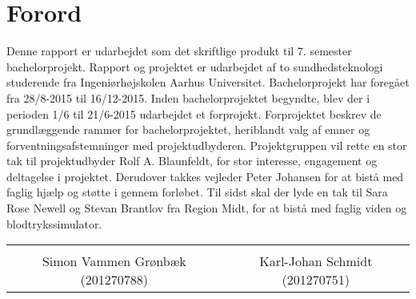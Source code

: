 \chapter*{Forord}

Denne rapport er udarbejdet som det skriftlige produkt til 7. semester bachelorprojekt. Rapport og projektet er udarbejdet af to sundhedsteknologi studerende fra Ingeniørhøjskolen Aarhus Universitet. Bachelorprojekt har foregået fra 28/8-2015 til 16/12-2015. Inden bachelorprojektet begyndte, blev der i perioden 1/6 til 21/6-2015 udarbejdet et forprojekt. Forprojektet beskrev de grundlæggende rammer for bachelorprojektet, heriblandt valg af emner og forventningsafstemninger med projektudbyderen. 
Projektgruppen vil rette en stor tak til projektudbyder Rolf A. Blaunfeldt, for stor interesse, engagement og deltagelse i projektet. Derudover takkes vejleder Peter Johansen for at bistå med faglig hjælp og støtte i gennem forløbet. Til sidst skal der lyde en tak til Sara Rose Newell og Stevan Brantlov fra Region Midt, for at bistå med faglig viden og blodtrykssimulator. 

\vspace{3cm}

\begin{table}[H]
	\centering
	\begin{tabular}{c c}
		\underline{\phantom{mmmmmmmmmmmmmmmmmmmmm}} & \underline{\phantom{mmmmmmmmmmmmmmmmmmmmm}} \\
		Simon Vammen Grønbæk (201270788) \vspace{2cm} & Karl-Johan Schmidt (201270751) \vspace{2cm}\\
	\end{tabular}
\end{table}